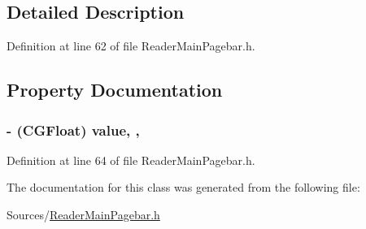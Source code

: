 \subsection{Detailed Description}


Definition at line 62 of file Reader\-Main\-Pagebar.\-h.



\subsection{Property Documentation}
\hypertarget{interface_reader_track_control_a2a91dd40b3e8d4757ac201fe8a3b9829}{
\subsubsection[{value}]{\setlength{\rightskip}{0pt plus 5cm}-\/ (C\-G\-Float) value\hspace{0.3cm}{\ttfamily [read]}, {\ttfamily [nonatomic]}, {\ttfamily [assign]}}}\label{dc/d59/interface_reader_track_control_a2a91dd40b3e8d4757ac201fe8a3b9829}


Definition at line 64 of file Reader\-Main\-Pagebar.\-h.



The documentation for this class was generated from the following file\-:\begin{DoxyCompactItemize}
\item 
Sources/\hyperlink{_reader_main_pagebar_8h}{Reader\-Main\-Pagebar.\-h}\end{DoxyCompactItemize}
